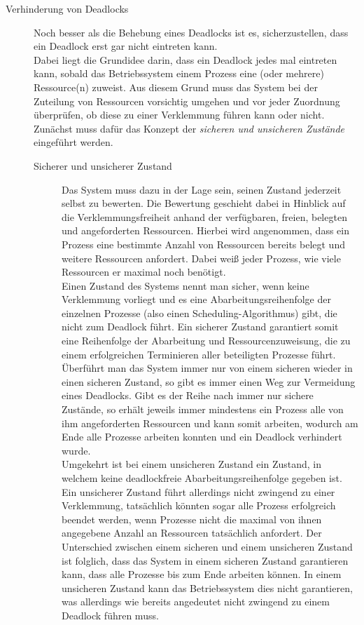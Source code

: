 \begin{description}
\begin{description}
						\end{description}
					
					\item[Verhinderung von Deadlocks]
					
						Noch besser als die Behebung eines Deadlocks ist es, sicherzustellen, dass ein Deadlock erst gar nicht eintreten kann.\\
						Dabei liegt die Grundidee darin, dass ein Deadlock jedes mal eintreten kann, sobald das Betriebssystem einem Prozess eine (oder mehrere) Ressource(n) zuweist. Aus diesem Grund muss das System bei der Zuteilung von Ressourcen vorsichtig umgehen und vor jeder Zuordnung überprüfen, ob diese zu einer Verklemmung führen kann oder nicht. Zunächst muss dafür das Konzept der \textit{sicheren und unsicheren Zustände} eingeführt werden.
						
						\begin{description}
							\item[Sicherer und unsicherer Zustand]
							
								Das System muss dazu in der Lage sein, seinen Zustand jederzeit selbst zu bewerten. Die Bewertung geschieht dabei in Hinblick auf die Verklemmungsfreiheit anhand der verfügbaren, freien, belegten und angeforderten Ressourcen. Hierbei wird angenommen, dass ein Prozess eine bestimmte Anzahl von Ressourcen bereits belegt und weitere Ressourcen anfordert. Dabei weiß jeder Prozess, wie viele Ressourcen er maximal noch benötigt.\\
								Einen Zustand des Systems nennt man sicher, wenn keine Verklemmung vorliegt und es eine Abarbeitungsreihenfolge der einzelnen Prozesse (also einen Scheduling-Algorithmus) gibt, die nicht zum Deadlock führt. Ein sicherer Zustand garantiert somit eine Reihenfolge der Abarbeitung und Ressourcenzuweisung, die zu einem erfolgreichen Terminieren aller beteiligten Prozesse führt. Überführt man das System immer nur von einem sicheren wieder in einen sicheren Zustand, so gibt es immer einen Weg zur Vermeidung eines Deadlocks. Gibt es der Reihe nach immer nur sichere Zustände, so erhält jeweils immer mindestens ein Prozess alle von ihm angeforderten Ressourcen und kann somit arbeiten, wodurch am Ende alle Prozesse arbeiten konnten und ein Deadlock verhindert wurde.\\
								Umgekehrt ist bei einem unsicheren Zustand ein Zustand, in welchem keine deadlockfreie Abarbeitungsreihenfolge gegeben ist. Ein unsicherer Zustand führt allerdings nicht zwingend zu einer Verklemmung, tatsächlich könnten sogar alle Prozess erfolgreich beendet werden, wenn Prozesse nicht die maximal von ihnen angegebene Anzahl an Ressourcen tatsächlich anfordert. Der Unterschied zwischen einem sicheren und einem unsicheren Zustand ist folglich, dass das System in einem sicheren Zustand garantieren kann, dass alle Prozesse bis zum Ende arbeiten können. In einem unsicheren Zustand kann das Betriebssystem dies nicht garantieren, was allerdings wie bereits angedeutet nicht zwingend zu einem Deadlock führen muss. \cite{SichererUnsichererZustandBennewitz} \cite{ModerneBetriebssysteme}
								

\end{description}
\end{description}
